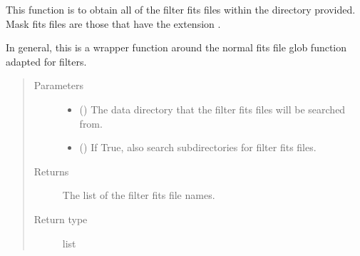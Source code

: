 \documentclass[letterpaper,10pt,english]{sphinxmanual}
\begin{document}
\begin{fulllineitems}
\label{\detokenize{docstrings/ifa_smeargle.masking.base_functions:ifa_smeargle.masking.base_functions.get_filter_fits_filenames}}
This function is to obtain all of the filter fits files
within the directory provided. Mask fits files are those that
have the extension .

In general, this is a wrapper function around the normal
fits file glob function adapted for filters.
\begin{quote}\begin{description}
\item[{Parameters}] \leavevmode\begin{itemize}
\item {} 
 () \textendash{} The data directory that the filter fits files will be
searched from.

\item {} 
 (\sphinxstyleliteralemphasis{\sphinxupquote{ (}}\sphinxstyleliteralemphasis{\sphinxupquote{)}}) \textendash{} If True, also search subdirectories for filter fits files.

\end{itemize}

\item[{Returns}] \leavevmode
{} \textendash{} The list of the filter fits file names.

\item[{Return type}] \leavevmode
list

\end{description}\end{quote}

\end{fulllineitems}

\end{document}
